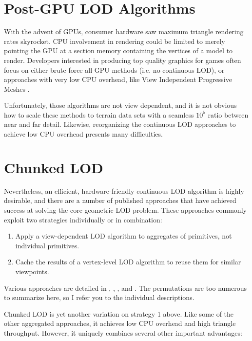 \documentclass[12pt]{article}
\begin{document}
\section{Post-GPU LOD Algorithms}

With the advent of GPUs, consumer hardware saw maximum triangle
rendering rates skyrocket.  CPU involvement in rendering could be
limited to merely pointing the GPU at a section memory containing the
vertices of a model to render.  Developers interested in producing top
quality graphics for games often focus on either brute force all-GPU
methods (i.e. no continuous LOD), or approaches with very low CPU
overhead, like View Independent Progressive Meshes
\cite{bloom}\cite{svarovsky}.
 
Unfortunately, those algorithms are not view dependent, and it is not
obvious how to scale these methods to terrain data sets with a
seamless $10^5$ ratio between near and far detail.  Likewise,
reorganizing the continuous LOD approaches to achieve low CPU overhead
presents many difficulties.
 
\section{Chunked LOD}

Nevertheless, an efficient, hardware-friendly continuous LOD algorithm
is highly desirable, and there are a number of published approaches
that have achieved success at solving the core geometric LOD problem.
These approaches commonly exploit two strategies individually or in
combination:
 
\begin{enumerate}
\item Apply a view-dependent LOD algorithm to aggregates of
primitives, not individual primitives.

\item Cache the results of a vertex-level LOD algorithm to reuse them
for similar viewpoints.
\end{enumerate}

Various approaches are detailed in \cite{deboer}, \cite{bloom},
\cite{cline}, \cite{levenberg} and \cite{pomeranz}.  The permutations
are too numerous to summarize here, so I refer you to the individual
descriptions.
 
Chunked LOD is yet another variation on strategy 1 above.  Like some
of the other aggregated approaches, it achieves low CPU overhead and
high triangle throughput.  However, it uniquely combines several
other important advantages:
\end{document}

